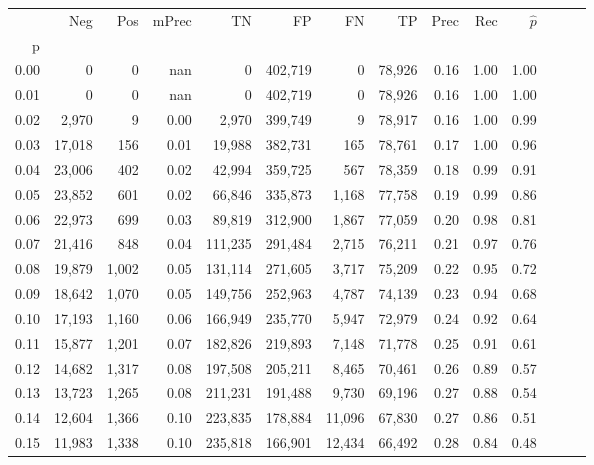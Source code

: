 \begin{tabular}{rrrrrrrrrrrrrr}
\toprule
{} &     Neg &    Pos & mPrec &       TN &       FP &      FN &      TP &  Prec &   Rec & $\hat{p}$ \\
p    &         &        &       &          &          &         &         &       &       &           \\
\midrule
0.00 &       0 &      0 &   nan &        0 &  402,719 &       0 &  78,926 &  0.16 &  1.00 &      1.00 \\
0.01 &       0 &      0 &   nan &        0 &  402,719 &       0 &  78,926 &  0.16 &  1.00 &      1.00 \\
0.02 &   2,970 &      9 &  0.00 &    2,970 &  399,749 &       9 &  78,917 &  0.16 &  1.00 &      0.99 \\
0.03 &  17,018 &    156 &  0.01 &   19,988 &  382,731 &     165 &  78,761 &  0.17 &  1.00 &      0.96 \\
0.04 &  23,006 &    402 &  0.02 &   42,994 &  359,725 &     567 &  78,359 &  0.18 &  0.99 &      0.91 \\
0.05 &  23,852 &    601 &  0.02 &   66,846 &  335,873 &   1,168 &  77,758 &  0.19 &  0.99 &      0.86 \\
0.06 &  22,973 &    699 &  0.03 &   89,819 &  312,900 &   1,867 &  77,059 &  0.20 &  0.98 &      0.81 \\
0.07 &  21,416 &    848 &  0.04 &  111,235 &  291,484 &   2,715 &  76,211 &  0.21 &  0.97 &      0.76 \\
0.08 &  19,879 &  1,002 &  0.05 &  131,114 &  271,605 &   3,717 &  75,209 &  0.22 &  0.95 &      0.72 \\
0.09 &  18,642 &  1,070 &  0.05 &  149,756 &  252,963 &   4,787 &  74,139 &  0.23 &  0.94 &      0.68 \\
0.10 &  17,193 &  1,160 &  0.06 &  166,949 &  235,770 &   5,947 &  72,979 &  0.24 &  0.92 &      0.64 \\
0.11 &  15,877 &  1,201 &  0.07 &  182,826 &  219,893 &   7,148 &  71,778 &  0.25 &  0.91 &      0.61 \\
0.12 &  14,682 &  1,317 &  0.08 &  197,508 &  205,211 &   8,465 &  70,461 &  0.26 &  0.89 &      0.57 \\
0.13 &  13,723 &  1,265 &  0.08 &  211,231 &  191,488 &   9,730 &  69,196 &  0.27 &  0.88 &      0.54 \\
0.14 &  12,604 &  1,366 &  0.10 &  223,835 &  178,884 &  11,096 &  67,830 &  0.27 &  0.86 &      0.51 \\
0.15 &  11,983 &  1,338 &  0.10 &  235,818 &  166,901 &  12,434 &  66,492 &  0.28 &  0.84 &      0.48 \\

\end{tabular}
